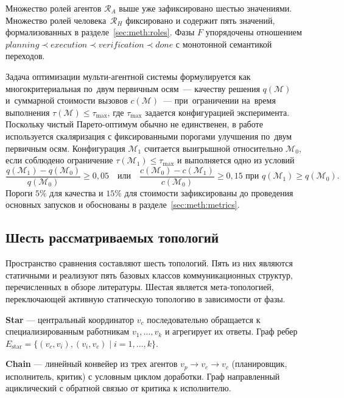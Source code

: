 Множество ролей агентов $\mathcal{R}_A$ выше уже зафиксировано
шестью значениями. Множество ролей человека~$\mathcal{R}_H$
фиксировано и содержит пять значений, формализованных в
разделе~\ref{sec:meth:roles}. Фазы $F$ упорядочены отношением
$\textit{planning} \prec \textit{execution} \prec
\textit{verification} \prec \textit{done}$ с монотонной семантикой
переходов.

Задача оптимизации мульти-агентной системы формулируется как
многокритериальная по~двум первичным осям~--- качеству решения
$q(\mathcal{M})$ и~суммарной стоимости вызовов $c(\mathcal{M})$~---
при~ограничении на~время выполнения
$\tau(\mathcal{M}) \le \tau_{\max}$, где $\tau_{\max}$ задается
конфигурацией эксперимента. Поскольку чистый Парето-оптимум обычно
не единственен, в работе используется скаляризация с фиксированными
порогами улучшения по~двум первичным осям. Конфигурация
$\mathcal{M}_1$ считается выигрышной относительно $\mathcal{M}_0$,
если соблюдено ограничение $\tau(\mathcal{M}_1) \le \tau_{\max}$ и
выполняется одно из условий
\begin{equation}
\frac{q(\mathcal{M}_1) - q(\mathcal{M}_0)}{q(\mathcal{M}_0)}
   \geq 0{,}05
   \quad\text{или}\quad
\frac{c(\mathcal{M}_0) - c(\mathcal{M}_1)}{c(\mathcal{M}_0)}
   \geq 0{,}15
   \text{ при } q(\mathcal{M}_1) \geq q(\mathcal{M}_0).
\label{eq:meth:thresholds}
\end{equation}
Пороги $5\%$ для качества и $15\%$ для стоимости зафиксированы
до проведения основных запусков и обоснованы в
разделе~\ref{sec:meth:metrics}.

\subsection{Шесть рассматриваемых топологий}
\label{sec:meth:topologies}

Пространство сравнения составляют шесть топологий. Пять из них
являются статичными и реализуют пять базовых классов коммуникационных
структур, перечисленных в обзоре литературы. Шестая является
мета-топологией, переключающей активную статическую топологию
в зависимости от фазы.

\textbf{Star} --- центральный координатор $v_c$ последовательно
обращается к специализированным работникам $v_1, \dots, v_k$ и
агрегирует их ответы. Граф ребер $E_{\text{star}} =
\{(v_c, v_i), (v_i, v_c) \mid i = 1, \dots, k\}$.

\textbf{Chain} --- линейный конвейер из трех агентов
$v_p \to v_e \to v_c$ (планировщик, исполнитель, критик)
с условным циклом доработки. Граф направленный ациклический
с обратной связью от критика к исполнителю.

